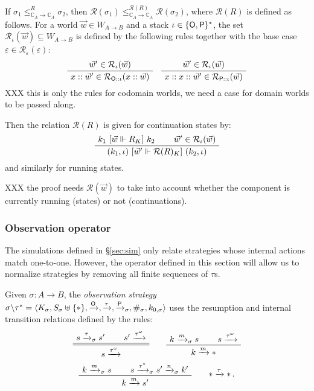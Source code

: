 \begin{lemma}
If
$\sigma_1 \le_{\mathbb{C}_A \rightarrow \mathbb{C}_A}^R \sigma_2$,
then
$\mathcal{R}(\sigma_1)
 \le_{\mathbb{C}_A \rightarrow \mathbb{C}_A}^{\mathcal{R}(R)}
 \mathcal{R}(\sigma_2)$,
where $\mathcal{R}(R)$ is defined as follows.
For a world $\vec{w} \in W_{A \rightarrow B}$
and a stack $\iota \in \{ \mathsf{O} ,  \mathsf{P} \}^*$,
the set $\mathcal{R}_\iota(\vec{w}) \subseteq W_{A \rightarrow B}$
is defined by the following rules together with the base case
$\varepsilon \in \mathcal{R}_\varepsilon(\varepsilon)$:
\[
    \AxiomC{$\vec{w}' \in \mathcal{R}_\iota(\vec{w})$}
    \UnaryInfC{$x :: \vec{w}' \in \mathcal{R}_{\kw{O} :: \iota}(x :: \vec{w})$}
    \DisplayProof
    \quad
    \AxiomC{$\vec{w}' \in \mathcal{R}_\iota(\vec{w})$}
    \UnaryInfC{$x :: x :: \vec{w}' \in \mathcal{R}_{\kw{P} :: \iota}(\vec{w})$}
    \DisplayProof
\]
XXX this is only the rules for codomain worlds,
we need a case for domain worlds to be passed along.

Then the relation $\mathcal{R}(R)$ is given for continuation states by:
\[
  \AxiomC{$k_1 \ifr{\vec{w} \Vdash R_K} k_2$}
  \AxiomC{$\vec{w}' \in \mathcal{R}_\iota(\vec{w})$}
  \BinaryInfC{$(k_1, \iota) \ifr{\vec{w}' \Vdash \mathcal{R}(R)_K} (k_2, \iota)$}
  \DisplayProof
\]
and similarly for running states.

XXX the proof needs $\mathcal{R}(\vec{w})$ to take into account
whether the component is currently running (states) or not (continuations).
\end{lemma}


\subsubsection{Observation operator} %

The simulations defined in \S\ref{sec:sim}
only relate strategies whose internal actions match one-to-one.
However, the operator defined in this section
will allow us to normalize strategies by removing
all finite sequences of $\tau$s.

\begin{definition}
Given $\sigma : A \rightarrow B$,
the \emph{observation strategy}
$\sigma \backslash \tau^* =
 \langle K_\sigma, S_\sigma \uplus \{\ast\},
         \xrightarrow{ \mathsf{O} },
         \xrightarrow{\tau},
         \xrightarrow{ \mathsf{P} }_\sigma,
         \#_\sigma, k_{0,\sigma} \rangle$
uses the resumption and internal transition relations
defined by the rules:
\[
  \AxiomC{$s \xrightarrow{\tau}_\sigma s'$}
  \AxiomC{$s' \xrightarrow{\tau^\omega}$}
  \doubleLine \BinaryInfC{$s \xrightarrow{\tau^\omega}$}
  \DisplayProof
  \qquad
  \AxiomC{$k \xrightarrow{m}_\sigma s$}
  \AxiomC{$s \xrightarrow{\tau^\omega}$}
  \BinaryInfC{$k \xrightarrow{m} \ast$}
  \DisplayProof
\]\[
  \AxiomC{$k \xrightarrow{m}_\sigma s$}
  \AxiomC{$s \xrightarrow{\tau^*}_\sigma s' \xrightarrow{n}_\sigma k'$}
  \BinaryInfC{$k \xrightarrow{m} s'$}
  \DisplayProof
  \qquad
  \ast \xrightarrow{\tau} \ast \,.
\]
\end{definition}

